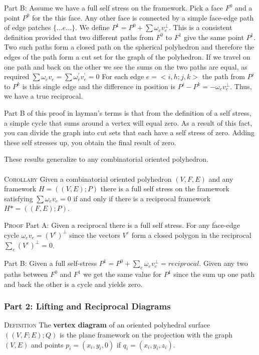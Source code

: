 \documentclass[11pt]{article}
\begin{document}
Part B: Assume we have a full self stress on the framework.
Pick a face $F^0$ and a point $P^0$ for the this face. Any other face is connected by a simple face-edge path of edge patches $\{...e...\}$. We define $P^1 = P^0 + \sum\omega_ev_e^\bot$. This is a consistent definition provided that two different paths from $F^0$ to $F^1$ give the same point $P^1$. Two such paths form a closed path on the spherical polyhedron and therefore the edges of the path form a cut set for the graph of the polyhedron. If we travel on one path and back on the other we see the sums on the two paths are equal, as required $\sum\omega_ev_e = \sum\omega_e^{'}v_e^{'} = 0$ For each edge $e = <i,h;j,k>$ the path from $P^j$ to $P^k$ is this single edge and the difference in position is $P^j - P^k = -\omega_ev_e^\bot$. Thus, we have a true reciprocal.

Part B of this proof in layman's terms is that from the definition of a self stress, a simple cycle that sums around a vertex will equal zero. As a result of this fact, you can divide the graph into cut sets that each have a self stress of zero. Adding these self stresses up, you obtain the final result of zero.

These results generalize to any combinatorial oriented polyhedron. \\
\\
\textsc{Corollary} Given a combinatorial oriented polyhedron $(V,F,E)$ and any framework $H = ((V,E);P)$ there is a full self stress on the framework satisfying $\sum \omega_ev_e = 0$ if and only if there is a reciprocal framework $H* = ((F,E);P)$. 

\textsc{Proof} Part A: Given a reciprocal there is a full self stress.
For any face-edge cycle $\omega_e v_e = (V^e)^{\bot}$ since the vectors $V^e$ form a closed polygon in the reciprocal $\sum_e(V^e)^\bot = 0$.

Part B: Given a full self-stress $P^1 = P^0 + \sum_e \omega_ev_e^\bot = reciprocal$.
Given any two paths between $F^0$ and $F^1$ we get the same value for $P^1$ since the sum up one path and back the other is a cycle and yields zero.


\subsubsection{Part 2: Lifting and Reciprocal Diagrams}
\textsc{Definition} The \textbf{vertex diagram} of an oriented polyhedral surface $((V,F;E);Q)$ is the plane framework on the projection with the graph $(V,E)$ and points $p_i = (x_i,y_i,0)$ if $q_i = (x_i,y_i,z_i)$.
\end{document}
